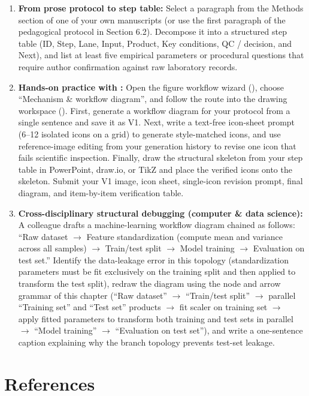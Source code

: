 \begin{enumerate}
\item \textbf{From prose protocol to step table:} Select a paragraph from the Methods section of one of your own manuscripts (or use the first paragraph of the pedagogical protocol in Section 6.2). Decompose it into a structured step table (ID, Step, Lane, Input, Product, Key conditions, QC / decision, and Next), and list at least five empirical parameters or procedural questions that require author confirmation against raw laboratory records.
\item \textbf{Hands-on practice with \scidraw{}:} Open the figure workflow wizard (), choose ``Mechanism \& workflow diagram'', and follow the route into the drawing workspace (). First, generate a workflow diagram for your protocol from a single sentence and save it as V1. Next, write a text-free icon-sheet prompt (6--12 isolated icons on a grid) to generate style-matched icons, and use reference-image editing from your generation history to revise one icon that fails scientific inspection. Finally, draw the structural skeleton from your step table in PowerPoint, draw.io, or TikZ and place the verified icons onto the skeleton. Submit your V1 image, icon sheet, single-icon revision prompt, final diagram, and item-by-item verification table.
\item \textbf{Cross-disciplinary structural debugging (computer \& data science):} A colleague drafts a machine-learning workflow diagram chained as follows: ``Raw dataset $\rightarrow$ Feature standardization (compute mean and variance across all samples) $\rightarrow$ Train/test split $\rightarrow$ Model training $\rightarrow$ Evaluation on test set.'' Identify the data-leakage error in this topology (standardization parameters must be fit exclusively on the training split and then applied to transform the test split), redraw the diagram using the node and arrow grammar of this chapter (``Raw dataset'' $\rightarrow$ ``Train/test split'' $\rightarrow$ parallel ``Training set'' and ``Test set'' products $\rightarrow$ fit scaler on training set $\rightarrow$ apply fitted parameters to transform both training and test sets in parallel $\rightarrow$ ``Model training'' $\rightarrow$ ``Evaluation on test set''), and write a one-sentence caption explaining why the branch topology prevents test-set leakage.
\end{enumerate}

\section*{References}

